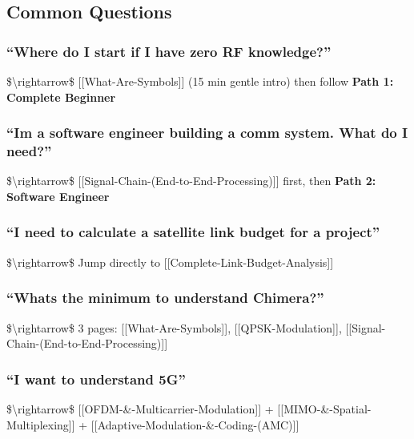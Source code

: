 \subsection{\texorpdfstring{ Common
Questions}{ Common Questions}}\label{common-questions}

\subsubsection{``Where do I start if I have zero RF
knowledge?''}\label{where-do-i-start-if-i-have-zero-rf-knowledge}

\$\textbackslash rightarrow\$ {[}{[}What-Are-Symbols{]}{]} (15 min
gentle intro) then follow \textbf{Path 1: Complete Beginner}

\subsubsection{``I\textquotesingle m a software engineer building a comm
system. What do I
need?''}\label{im-a-software-engineer-building-a-comm-system.-what-do-i-need}

\$\textbackslash rightarrow\$
{[}{[}Signal-Chain-(End-to-End-Processing){]}{]} first, then
\textbf{Path 2: Software Engineer}

\subsubsection{``I need to calculate a satellite link budget for a
project''}\label{i-need-to-calculate-a-satellite-link-budget-for-a-project}

\$\textbackslash rightarrow\$ Jump directly to
{[}{[}Complete-Link-Budget-Analysis{]}{]}

\subsubsection{``What\textquotesingle s the minimum to understand
Chimera?''}\label{whats-the-minimum-to-understand-chimera}

\$\textbackslash rightarrow\$ 3 pages: {[}{[}What-Are-Symbols{]}{]},
{[}{[}QPSK-Modulation{]}{]},
{[}{[}Signal-Chain-(End-to-End-Processing){]}{]}

\subsubsection{``I want to understand
5G''}\label{i-want-to-understand-5g}

\$\textbackslash rightarrow\$
{[}{[}OFDM-\&-Multicarrier-Modulation{]}{]} +
{[}{[}MIMO-\&-Spatial-Multiplexing{]}{]} +
{[}{[}Adaptive-Modulation-\&-Coding-(AMC){]}{]}

